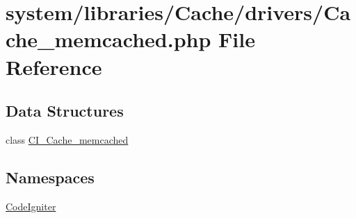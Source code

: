 \hypertarget{_cache__memcached_8php}{}\section{system/libraries/\+Cache/drivers/\+Cache\+\_\+memcached.php File Reference}
\label{_cache__memcached_8php}
\subsection*{Data Structures}
\begin{DoxyCompactItemize}
\item 
class \mbox{\hyperlink{class_c_i___cache__memcached}{C\+I\+\_\+\+Cache\+\_\+memcached}}
\end{DoxyCompactItemize}
\subsection*{Namespaces}
\begin{DoxyCompactItemize}
\item 
 \mbox{\hyperlink{namespace_code_igniter}{Code\+Igniter}}
\end{DoxyCompactItemize}
